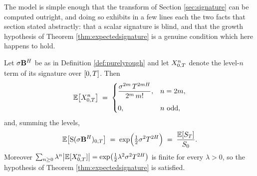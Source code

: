 


The model is simple enough that the transform of Section \ref{sec:signature} can be computed
outright, and doing so exhibits in a few lines each the two facts that section stated abstractly:
that a scalar signature is blind, and that the growth hypothesis of Theorem
\ref{thm:expectedsignature} is a genuine condition which here happens to hold.

\begin{proposition}\label{prop:roughexpectedsig}
Let $\sigma\mathbf{B}^{H}$ be as in Definition \ref{def:purelyrough} and let $X^n_{0,T}$
denote the level-$n$ term of its signature over $[0,T]$. Then
\begin{equation}\label{eq:roughexpectedsiglevels}
\mathbb{E}\bigl[X^n_{0,T}\bigr] \;=\;
\begin{cases}
\dfrac{\sigma^{2m}\,T^{2mH}}{2^{m}\,m!}, & n = 2m, \\[10pt]
0, & n \text{ odd},
\end{cases}
\end{equation}
and, summing the levels,
\begin{equation}\label{eq:roughexpectedsig}
\mathbb{E}\bigl[\mathrm{S}(\sigma\mathbf{B}^{H})_{0,T}\bigr]
\;=\; \exp\Bigl(\tfrac12\sigma^2T^{2H}\Bigr)
\;=\; \frac{\mathbb{E}[S_T]}{S_0} .
\end{equation}
Moreover
$\sum_{n\geq0}\lambda^{n}\bigl|\mathbb{E}[X^n_{0,T}]\bigr| = \exp\bigl(\tfrac12\lambda^2\sigma^2T^{2H}\bigr)$
is finite for every $\lambda>0$, so the hypothesis of Theorem \ref{thm:expectedsignature} is
satisfied.
\end{proposition}

